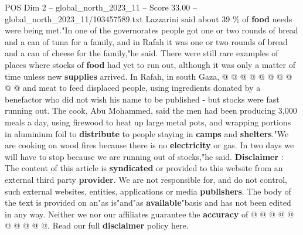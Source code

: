 \begin{textsample}{POS Dim 2 – global\_north\_2023\_11 – Score 33.00 – global\_north\_2023\_11/103457589.txt}
Lazzarini said about 39 \% of \textbf{food} needs were being met."In one of the governorates people got one or two rounds of bread and a can of tuna for a family, and in Rafah it was one or two rounds of bread and a can of cheese for the family,"he said.
There were still rare examples of places where stocks of \textbf{food} had yet to run out, although it was only a matter of time unless new \textbf{supplies} arrived.
In Rafah, in south Gaza, @ @ @ @ @ @ @ @ @ @ and meat to feed displaced people, using ingredients donated by a benefactor who did not wish his name to be published - but stocks were fast running out.
The cook, Abu Mohammed, said the men had been producing 3,000 meals a day, using firewood to heat up large metal pots, and wrapping portions in aluminium foil to \textbf{distribute} to people staying in \textbf{camps} and \textbf{shelters}."We are cooking on wood fires because there is no \textbf{electricity} or gas.
In two days we will have to stop because we are running out of stocks,"he said. \textbf{Disclaimer} : The content of this article is \textbf{syndicated} or provided to this website from an external third party \textbf{provider}.
We are not responsible for, and do not control, such external websites, entities, applications or media \textbf{publishers}.
The body of the text is provided on an"as is"and"as \textbf{available}"basis and has not been edited in any way.
Neither we nor our affiliates guarantee the \textbf{accuracy} of @ @ @ @ @ @ @ @ @ @.
Read our full \textbf{disclaimer} policy here.

\end{textsample}

